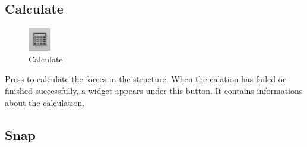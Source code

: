 \documentclass[a4paper,11pt]{report}
\begin{document}
\subsection{Calculate}

\begin{minipage}[h]{4cm}
\begin{figure}[H]
\begin{center}
\includegraphics[scale=0.6]{../pictures/calctoolbar.png}
\caption{Calculate}
\label{pic:calctoolbar}
\end{center}
\end{figure}
\end{minipage}
\begin{minipage}[h]{\textwidth-4cm}
Press to calculate the forces in the structure. When the calation has failed or finished successfully, a widget appears under this button. It contains informations about the calculation.
\end{minipage}

\subsection{Snap}
\end{document}
